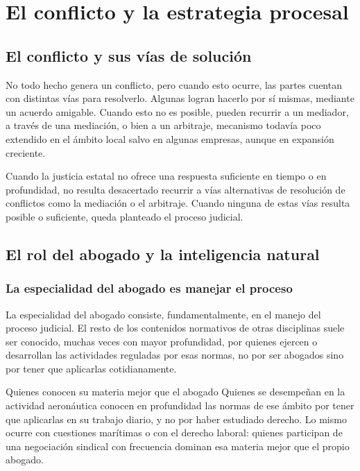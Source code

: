 \documentclass[12pt,oneside]{book}
\begin{document}
\chapter{El conflicto y la estrategia procesal}

\section{El conflicto y sus vías de solución}

No todo hecho genera un conflicto, pero cuando esto ocurre, las partes cuentan con distintas vías para resolverlo. Algunas logran hacerlo por sí mismas, mediante un acuerdo amigable. Cuando esto no es posible, pueden recurrir a un mediador, a través de una mediación, o bien a un arbitraje, mecanismo todavía poco extendido en el ámbito local salvo en algunas empresas, aunque en expansión creciente.

\begin{important}
Cuando la justicia estatal no ofrece una respuesta suficiente en tiempo o en profundidad, no resulta desacertado recurrir a vías alternativas de resolución de conflictos como la mediación o el arbitraje. Cuando ninguna de estas vías resulta posible o suficiente, queda planteado el proceso judicial.
\end{important}

\section{El rol del abogado y la inteligencia natural}

\subsection{La especialidad del abogado es manejar el proceso}

La especialidad del abogado consiste, fundamentalmente, en el manejo del proceso judicial. El resto de los contenidos normativos de otras disciplinas suele ser conocido, muchas veces con mayor profundidad, por quienes ejercen o desarrollan las actividades reguladas por esas normas, no por ser abogados sino por tener que aplicarlas cotidianamente.

\begin{example}{Quienes conocen su materia mejor que el abogado}
Quienes se desempeñan en la actividad aeronáutica conocen en profundidad las normas de ese ámbito por tener que aplicarlas en su trabajo diario, y no por haber estudiado derecho. Lo mismo ocurre con cuestiones marítimas o con el derecho laboral: quienes participan de una negociación sindical con frecuencia dominan esa materia mejor que el propio abogado.
\end{example}
\end{document}
